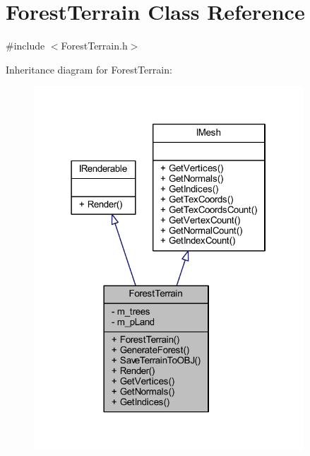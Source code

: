 \hypertarget{class_forest_terrain}{}\section{Forest\+Terrain Class Reference}
\label{class_forest_terrain}


{\ttfamily \#include $<$Forest\+Terrain.\+h$>$}



Inheritance diagram for Forest\+Terrain\+:\nopagebreak
\begin{figure}[H]
\begin{center}
\leavevmode
\includegraphics[width=286pt]{class_forest_terrain__inherit__graph}
\end{center}
\end{figure}


